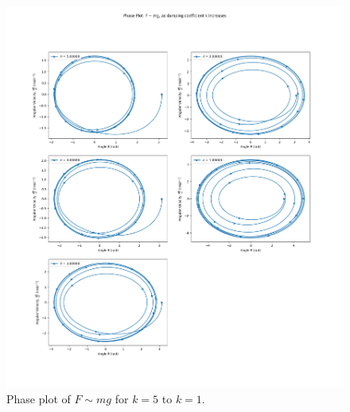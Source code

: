 \documentclass[10pt, twocolumn]{article}
\begin{document}
\begin{figure}
    \centering
    \includegraphics[width = \columnwidth]{Projects/ForcedSimplePendulum/Plots/Phase plot of F~mg as damping coefficient k increases from 5 to 1.png}
    \caption{Phase plot of $F \sim{mg}$ for $k = 5$ to $k = 1$.}
    \label{fig:enter-label}
\end{figure}
\end{document}
